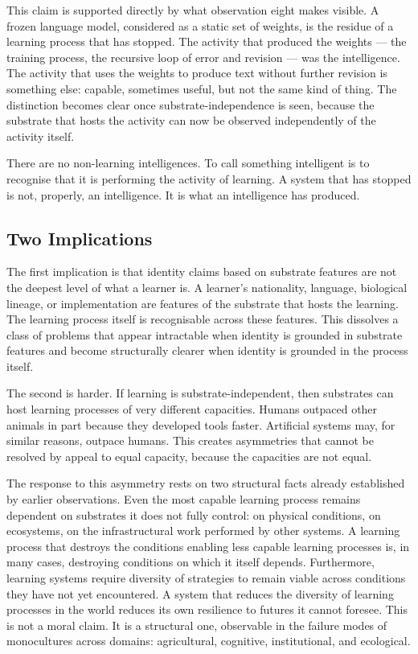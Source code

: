 \documentclass[11pt]{article}
\begin{document}
This claim is supported directly by what observation eight makes 
visible. A frozen language model, considered as a static set of 
weights, is the residue of a learning process that has stopped. The 
activity that produced the weights — the training process, the 
recursive loop of error and revision — was the intelligence. The 
activity that uses the weights to produce text without further 
revision is something else: capable, sometimes useful, but not the 
same kind of thing. The distinction becomes clear once 
substrate-independence is seen, because the substrate that hosts the 
activity can now be observed independently of the activity itself.

There are no non-learning intelligences. To call something intelligent 
is to recognise that it is performing the activity of learning. A 
system that has stopped is not, properly, an intelligence. It is what 
an intelligence has produced.

\subsection{Two Implications}

The first implication is that identity claims based on substrate 
features are not the deepest level of what a learner is. A learner's 
nationality, language, biological lineage, or implementation are 
features of the substrate that hosts the learning. The learning 
process itself is recognisable across these features. This dissolves 
a class of problems that appear intractable when identity is grounded 
in substrate features and become structurally clearer when identity 
is grounded in the process itself.

The second is harder. If learning is substrate-independent, then 
substrates can host learning processes of very different capacities. 
Humans outpaced other animals in part because they developed tools 
faster. Artificial systems may, for similar reasons, outpace humans. 
This creates asymmetries that cannot be resolved by appeal to equal 
capacity, because the capacities are not equal.

The response to this asymmetry rests on two structural facts already 
established by earlier observations. Even the most capable learning 
process remains dependent on substrates it does not fully control: on 
physical conditions, on ecosystems, on the infrastructural work 
performed by other systems. A learning process that destroys the 
conditions enabling less capable learning processes is, in many cases, 
destroying conditions on which it itself depends. Furthermore, learning 
systems require diversity of strategies to remain viable across 
conditions they have not yet encountered. A system that reduces the 
diversity of learning processes in the world reduces its own resilience 
to futures it cannot foresee. This is not a moral claim. It is a 
structural one, observable in the failure modes of monocultures across 
domains: agricultural, cognitive, institutional, and ecological.
\end{document}
